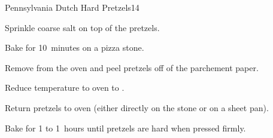 \begin{recipe}{Pennsylvania Dutch Hard Pretzels}{}{14}
\begin{directions}
\item Sprinkle coarse salt on top of the pretzels.
\item Bake for 10~minutes on a pizza stone.
\item Remove from the oven and peel pretzels off of the parchement paper.
\item Reduce temperature to oven to .
\item Return pretzels to oven (either directly on the stone or on a sheet pan).
\item Bake for 1 to 1\half{}~hours until pretzels are hard when pressed firmly.
\end{directions}

\end{recipe}
